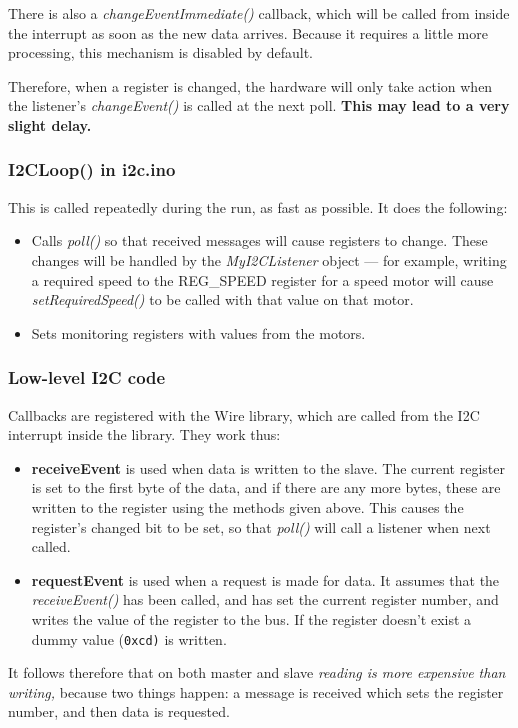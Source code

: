 There is also a \emph{changeEventImmediate()} callback, which will be called
from inside the interrupt as soon as the new data arrives. Because it requires
a little more processing, this mechanism is disabled by default.

Therefore, when a register is changed, the hardware will only take action when the listener's \emph{changeEvent()} is called
at the next poll. \textbf{This may lead to a very slight delay.} 

\subsubsection{I2CLoop() in i2c.ino}
This is called repeatedly during the run, as fast as possible. It does the following:
\begin{itemize}
\item Calls \emph{poll()} so that received messages will cause registers to change. These changes will be handled by the
\emph{MyI2CListener} object --- for example, writing a required speed to the REG\_SPEED register for a speed motor
will cause \emph{setRequiredSpeed()} to be called with that value on that motor.
\item Sets monitoring registers with values from the motors.
\end{itemize}



\subsubsection{Low-level I2C code}
Callbacks are registered with the Wire library, which are called from the I2C interrupt inside the library. They work thus:
\begin{itemize}
\item \textbf{receiveEvent} is used when data is written to the slave. The current register is set to
the first byte of the data, and if there are any more bytes, these are written to the register using the
methods given above.
This causes the register's changed bit to be set, so that \emph{poll()} will call a listener when next called.
\item \textbf{requestEvent} is used when a request is made for data. It assumes that the \emph{receiveEvent()} has been called, and has set the current register number, and writes the value
of the register to the bus. If the register doesn't exist a dummy value (\texttt{0xcd)} is written.
\end{itemize}
It follows therefore that on both master and slave \emph{reading is more expensive than writing,} because two things
happen: a message is received which sets the register number, and then data is requested.

